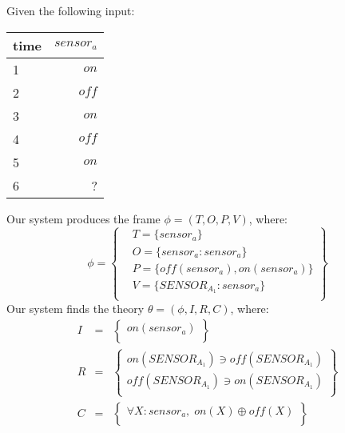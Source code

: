 
Given the following input:
\begin{table}[ht!]
\begin{center}
\begin{tabular}{|l|r|}
\hline
time & $\mathit{sensor}_a$\\
\hline
1 & $\mathit{on}$ \\
2 & $\mathit{off}$ \\
3 & $\mathit{on}$ \\
4 & $\mathit{off}$ \\
5 & $\mathit{on}$ \\
6 & ? \\
\hline
\end{tabular}
\end{center}
\end{table}

Our system produces the frame $\phi = (T, O, P, V)$, where:
\begin{equation*}
\phi = \left \{
\begin{aligned}
& T = \{ 
sensor_a
\}\\
& O = \{
\mathit{sensor}_a: sensor_a
\}\\
& P = \{
\mathit{off}(sensor_a),\mathit{on}(sensor_a)
\}\\
& V = \{
SENSOR_A_1: sensor_a
\}\\
\end{aligned}\right\}
\end{equation*}
Our system finds the theory $\theta = (\phi, I, R, C)$, where:
\begin{eqnarray*}
I & = & \left\{ \begin{array}{l}
\mathit{on}(\mathit{sensor}_a)\\
\end{array}\right\}\\
R & = &  \left\{ \begin{array}{l}
\mathit{on}(\mathit{SENSOR}_A_1) \ni \mathit{off}(\mathit{SENSOR}_A_1)\\
\mathit{off}(\mathit{SENSOR}_A_1) \ni \mathit{on}(\mathit{SENSOR}_A_1)\\
\end{array}\right\}\\
C & = & \left\{ \begin{array}{l}
\forall X : sensor_a,\;\mathit{on}(X) \oplus \mathit{off}(X)\\
\end{array}\right\}\\
\end{eqnarray*}

